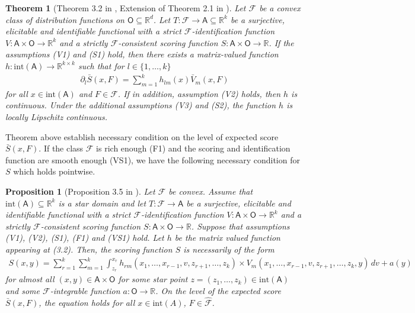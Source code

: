 \documentclass{article}
\newtheorem{prop}{Proposition}
\newtheorem{theorem}{Theorem}
\newcommand{\R}{\mathbb{R}}
\newcommand{\cf}{\mathcal{F}}
\begin{document}
\begin{theorem}[Theorem 3.2 in \cite{fissler2016multiq}, Extension of Theorem 2.1 in \cite{osband1985}]
Let $\cf$ be a convex class of distribution functions on $\mathsf{O} \subseteq \R^d$. Let $T: \cf \to \mathsf{A} \subseteq \R^k$ be a surjective, elicitable and identifiable functional with a strict $\cf$-identification function $V: \mathsf{A} \times \mathsf{O} \to \R^k$ and a strictly $\cf$-consistent scoring function $S: \mathsf{A} \times \mathsf{O} \to \R$. If the assumptions (V1) and (S1) hold, then there exists a matrix-valued function $h: \mathrm{int}(\mathsf{A}) \to \R^{k \times k}$ such that for $l \in \{1, \ldots, k\}$
\begin{align}
\partial_l \bar{S}(x, F) = \sum_{m=1}^{k} h_{lm}(x) \bar{V}_m(x, F)
\end{align}
for all $x \in \mathrm{int}(\mathsf{A})$ and $F \in \cf$. If in addition, assumption (V2) holds, then $h$ is continuous. Under the additional assumptions (V3) and (S2), the function $h$ is locally Lipschitz continuous.
\end{theorem}

Theorem above establish necessary condition on the level of expected score $\bar{S}(x,F)$. If the class $\cf$ is rich enough (F1) and the scoring and identification function are smooth enough (VS1), we have the following necessary condition for $S$ which holds pointwise.

\begin{prop}[Proposition 3.5 in \cite{fissler2016multiq}]
Let $\cf$ be convex. Assume that $\mathrm{int}(\mathsf{A}) \subseteq \R^k$ is a star domain and let $T: \cf \to \mathsf{A}$ be a surjective, elicitable and identifiable functional with a strict $\cf$-identification function $V: \mathsf{A} \times \mathsf{O} \to \R^k$ and a strictly $\cf$-consistent scoring function $S: \mathsf{A} \times \mathsf{O} \to \R$. Suppose that assumptions (V1), (V2), (S1), (F1) and (VS1) hold. Let $h$ be the matrix valued function appearing at (3.2). Then, the scoring function $S$ is necessarily of the form
\begin{align}
S(x, y) = \sum_{r=1}^{k} \sum_{m=1}^{k} \int_{z_r}^{x_r} h_{rm}(x_1, \ldots, x_{r-1}, v, z_{r+1}, \ldots, z_k) \times V_m(x_1, \ldots, x_{r-1}, v, z_{r+1}, \ldots, z_k, y) \, dv + a(y)
\end{align}
for almost all $(x, y) \in \mathsf{A} \times \mathsf{O}$ for some star point $z = (z_1, \ldots, z_k) \in \mathrm{int}(\mathsf{A})$ and some $\cf$-integrable function $a: \mathsf{O} \to \R$. On the level of the expected score $\bar{S}(x, F)$, the equation holds for all $x \in \mathrm{int}(A)$, $F \in \hat{\cf}$.
\end{prop}
\end{document}
